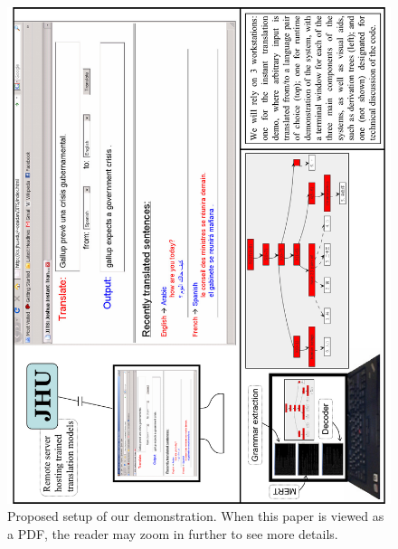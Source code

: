 \documentclass[11pt]{article}
\begin{document}
\begin{figure}[t]
\begin{centering}
\includegraphics[scale=0.57,angle=270]{demo-setup.pdf}
\caption{Proposed setup of our demonstration. When this paper is viewed as a PDF, the reader
may zoom in further to see more details.}
\label{fig:setup}
\end{centering}
\end{figure}







\end{document}
